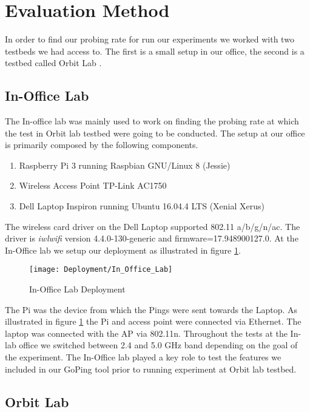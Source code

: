 \section{Evaluation Method}\label{Evaluation_Method}

In order to find our probing rate for run our experiments we worked with two testbeds we had access to. The first is a small setup in our office, the second is a testbed called Orbit Lab \cite{orbit2005}.

\subsection*{In-Office Lab}

The In-office lab was mainly used to work on finding the probing rate at which the test in Orbit lab testbed were going to be conducted. The setup at our office is primarily composed by the following components.

\begin{enumerate}
	\item Raspberry Pi 3 running Raspbian GNU/Linux 8 (Jessie)
	\item Wireless Access Point TP-Link AC1750
	\item Dell Laptop Inspiron running Ubuntu 16.04.4 LTS (Xenial Xerus)
\end{enumerate}

The wireless card driver on the Dell Laptop supported 802.11 a/b/g/n/ac. The driver is \textit{iwlwifi} version 4.4.0-130-generic and firmware=17.948900127.0. At the In-Office lab we setup our deployment as illustrated in figure \ref{image:In_Office_Lab_Deployment}.

\begin{figure}[h]
	\centering
	\texttt{[image: Deployment/In\_Office\_Lab]}
	\caption{In-Office Lab Deployment}
	\label{image:In_Office_Lab_Deployment}
\end{figure}

The Pi was the device from which the Pings were sent towards the Laptop. As illustrated in figure \ref{image:In_Office_Lab_Deployment} the Pi and access point were connected via Ethernet. The laptop was connected with the AP via 802.11n. Throughout the tests at the In-lab office we switched between 2.4 and 5.0 GHz band depending on the goal of the experiment. The In-Office lab played a key role to test the features we included in our GoPing tool prior to running experiment at Orbit lab testbed.

\subsection*{Orbit Lab}

